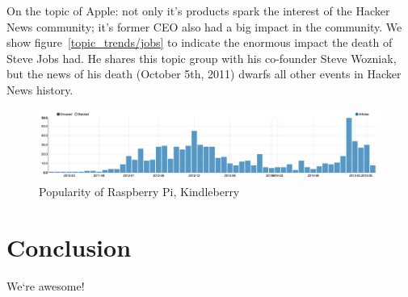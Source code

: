 On the topic of Apple: not only it's products spark the interest of the Hacker News community; it's former CEO also had a big impact in the community. We show figure~\ref{topic_trends/jobs} to indicate the enormous impact the death of Steve Jobs had. He shares this topic group with his co-founder Steve Wozniak, but the news of his death (October 5th, 2011) dwarfs all other events in Hacker News history.

\begin{figure}[ht!]
	\caption{Popularity of Raspberry Pi, Kindleberry}
	\label{fig:trend_raspberry}
	\centering
	\includegraphics[width=14cm]{topic_trends/raspberry}
\end{figure}



\section{Conclusion}
We`re awesome!